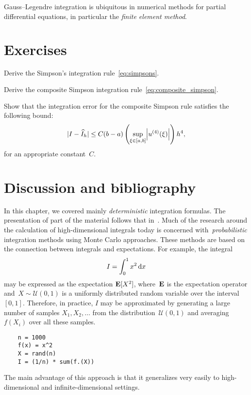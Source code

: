 Gauss--Legendre integration is ubiquitous in numerical methods for partial differential equations,
in particular the \emph{finite element method}.

\section{Exercises}
\begin{exercise}
    Derive the Simpson's integration rule~\eqref{eq:simpsons}.
\end{exercise}

\begin{exercise}
    \label{exercise:composite_simpson}
    Derive the composite Simpson integration rule~\eqref{eq:composite_simpson}.
\end{exercise}

\begin{exercise}
    Show that the integration error for the composite Simpson rule satisfies the following bound:
    \[
        \abs{I - \widehat I_h}
        \leq C (b-a) \left( \sup_{\xi \in [a, b]} \abs*{u^{(4)}(\xi)} \right) h^4,
    \]
    for an appropriate constant~$C$.
\end{exercise}

\section{Discussion and bibliography}
In this chapter,
we covered mainly \emph{deterministic} integration formulas.
The presentation of part of the material follows that in~\cite{Legat}.
Much of the research around the calculation of high-dimensional integrals today is concerned with~\emph{probabilistic} integration methods using Monte Carlo approaches.
These methods are based on the connection between integrals and expectations.
For example, the integral
\[
    I = \int_{0}^{1} x^2 \, \mathrm d x
\]
may be expressed as the expectation $\mathbf E [X^2]$,
where~$\mathbf E$ is the expectation operator and~$X \sim \mathcal U(0, 1)$ is a uniformly distributed random variable over the interval~$[0, 1]$.
Therefore, in practice, $I$ may be approximated by generating a large number of samples $X_1, X_2,\dotsc$ from the distribution~$\mathcal U(0, 1)$
and averaging $f(X_i)$ over all these samples.
\begin{verbatim}
    n = 1000
    f(x) = x^2
    X = rand(n)
    I = (1/n) * sum(f.(X))
\end{verbatim}
The main advantage of this approach is that it generalizes very easily to high-dimensional and infinite-dimensional settings.

